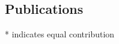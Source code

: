 \documentclass[margin,line,letterpaper]{resume}
\begin{document}
\begin{resume}
    \section{\mysidestyle Publications}

\newcommand\blfootnote[1]{%
  \begingroup
  \renewcommand\thefootnote{}\footnote{#1}%
  \addtocounter{footnote}{-1}%
  \endgroup
}
    
\def\FormatName#1{%
  \def\myname{Siavash Mirarab}
  \def\mynamee{Siavash Mirarab*}%
  \edef\name{#1}%
  \ifx\name\myname
    \textbf{#1}%
  \else
    \ifx\name\mynamee
       \textbf{Siavash Mirarab}*
    \else
      #1%
    \fi
  \fi
}

* indicates equal contribution

\vspace{-2pt}
\begin{spacing}{1.2}

\end{spacing}


\vspace{-10pt}


\end{resume}
\end{document}
